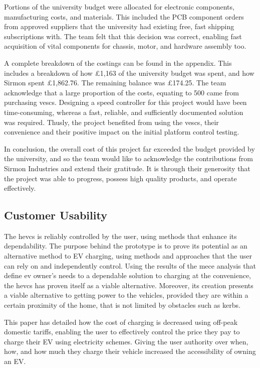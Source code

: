 \documentclass [12pt]{article}
\begin{document}
Portions of the university budget were allocated for electronic components, manufacturing costs, and materials. This included the PCB component orders from approved suppliers that the university had existing free, fast shipping subscriptions with. The team felt that this decision was correct, enabling fast acquisition of vital components for chassis, motor, and hardware assembly too.

A complete breakdown of the costings can be found in the appendix. This includes a breakdown of how £1,163 of the university budget was spent, and how Sirmon spent £1,862.76. The remaining balance was £174.25. The team acknowledge that a large proportion of the costs, equating to 500 came from purchasing \gls{vesc}s. Designing a speed controller for this project would have been time-consuming, whereas a fast, reliable, and sufficiently documented solution was required. Thusly, the project benefited from using the \gls{vesc}s, their convenience and their positive impact on the initial platform control testing.

In conclusion, the overall cost of this project far exceeded the budget provided by the university, and so the team would like to acknowledge the contributions from Sirmon Industries and extend their gratitude. It is through their generosity that the project was able to progress, possess high quality products, and operate effectively.

\subsection{Customer Usability}

The \gls{hevcs} is reliably controlled by the user, using methods that enhance its dependability. The purpose behind the prototype is to prove its potential as an alternative method to EV charging, using methods and approaches that the user can rely on and independently control. Using the results of the \gls{mece} analysis that define \gls{ev} owner’s needs to a dependable solution to charging at the convenience, the \gls{hevcs} has proven itself as a viable alternative. Moreover, its creation presents a viable alternative to getting power to the vehicles, provided they are within a certain proximity of the home, that is not limited by obstacles such as kerbs.

This paper has detailed how the cost of charging is decreased using off-peak domestic tariffs, enabling the user to effectively control the price they pay to charge their EV using electricity schemes. Giving the user authority over when, how, and how much they charge their vehicle increased the accessibility of owning an EV.
\end{document}

